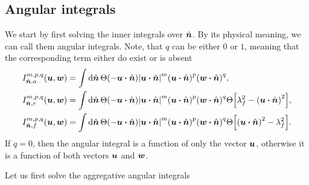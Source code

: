 \documentclass[aps,prl,preprint,groupedaddress,10pt]{revtex4-2}
\begin{document}
\subsection{Angular integrals}
We start by first solving the inner integrals over $\hat{\vb*{n}}$. By its physical meaning, we can call
them angular integrals. Note, that $q$ can be either $0$ or $1$, meaning that the
corresponding term either do exist or is absent
\begin{equation}
    \begin{split}
        I_{\bn,a}^{m,p,q}\pqty{\bu,\bw}&=\int\dd{\bn}\Theta\pqty{-\bu\vdot\bn}
        \abs{\bu\vdot\bn}^m\pqty{\bu\vdot\bn}^p\pqty{\bw\vdot\bn}^q,\\
        I_{\bn,r}^{m,p,q}\pqty{\bu,\bw}&=\int\dd{\bn}\Theta\pqty{-\bu\vdot\bn}
        \abs{\bu\vdot\bn}^m\pqty{\bu\vdot\bn}^p\pqty{\bw\vdot\bn}^q
        \Theta\bqty{\lambda_f^2-\pqty{\bu\vdot\bn}^2},\\
        I_{\bn,f}^{m,p,q}\pqty{\bu,\bw}&=\int\dd{\bn}\Theta\pqty{-\bu\vdot\bn}
        \abs{\bu\vdot\bn}^m\pqty{\bu\vdot\bn}^p\pqty{\bw\vdot\bn}^q
        \Theta\bqty{\pqty{\bu\vdot\bn}^2-\lambda_f^2}.\\
    \end{split}
\end{equation}
If $q=0$, then the angular integral is a function of only the vector $\vb*{u}$, otherwise it is
a function of both vectors $\vb*{u}$ and $\vb*{w}$.

Let us first solve the aggregative angular integrals
\end{document}
